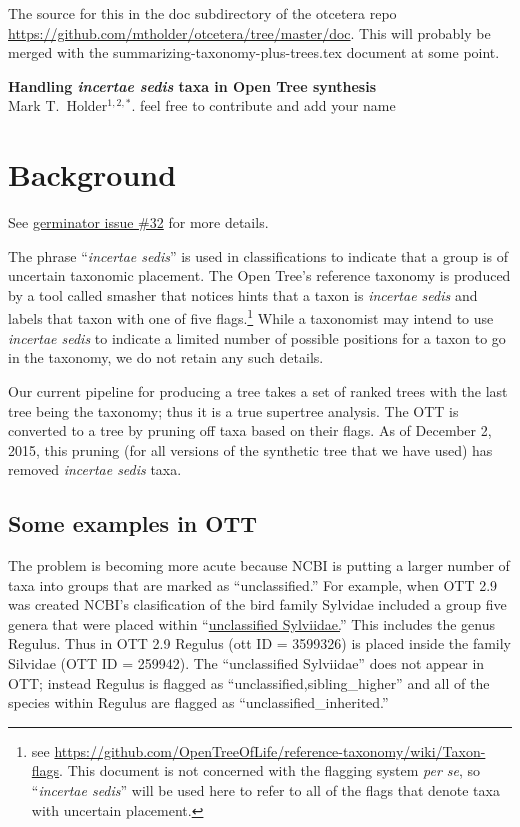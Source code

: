 \documentclass[11pt]{article}
\newcommand{\insed}{{\em incertae sedis}\xspace}
\begin{document}
The source for this in the doc subdirectory of the otcetera
    repo \url{https://github.com/mtholder/otcetera/tree/master/doc}.
This will probably be merged with the summarizing-taxonomy-plus-trees.tex document at
    some point.
\begin{center}
    {\bf Handling \insed taxa in Open Tree synthesis} \\
{Mark T.~Holder$^{1,2,\ast}$. feel free to contribute and add your name}
\end{center}
\tableofcontents
\section{Background}
See \href{https://github.com/OpenTreeOfLife/germinator/issues/32}{germinator issue \#32} for more details.

The phrase ``\insed'' is used in classifications to indicate that a group is of uncertain
    taxonomic placement.
The Open Tree's reference taxonomy is produced by a tool called smasher that notices hints that a taxon
    is \insed and labels that taxon with one of five flags.\footnote{see \url{https://github.com/OpenTreeOfLife/reference-taxonomy/wiki/Taxon-flags}. This document is not
    concerned with the flagging system {\em per se}, so ``\insed'' will be used here to
    refer to all of the flags that denote taxa with uncertain placement.}
While a taxonomist may intend to use \insed to indicate a limited number of possible positions for 
    a taxon to go in the taxonomy, we do not retain any such details.


Our current pipeline for producing a tree takes a set of ranked trees with the last tree
    being the taxonomy; thus it is a true supertree analysis.
The OTT is converted to a tree by pruning off taxa based on their flags.
As of December 2, 2015, this pruning (for all versions of the synthetic tree that we have used)
    has removed \insed taxa.

\subsection{Some examples in OTT}
The problem is becoming more acute because NCBI is putting a larger number of taxa into groups that
    are marked as ``unclassified.''
For example, when OTT 2.9 was created NCBI's clasification of the bird family Sylvidae included 
    a group five genera that were placed within ``\href{http://www.ncbi.nlm.nih.gov/Taxonomy/Browser/wwwtax.cgi?mode=Undef&id=36270&lvl=3&lin=f&keep=1&srchmode=1&unlock}{unclassified Sylviidae.}''
This includes the genus {Regulus}.
Thus in OTT 2.9 Regulus (ott ID = 3599326) is placed inside the family Silvidae (OTT ID = 259942).
The ``unclassified Sylviidae'' does not appear in OTT; instead Regulus is flagged as ``unclassified,sibling\_higher''
and all of the species within Regulus are flagged as ``unclassified\_inherited.''
\end{document}
